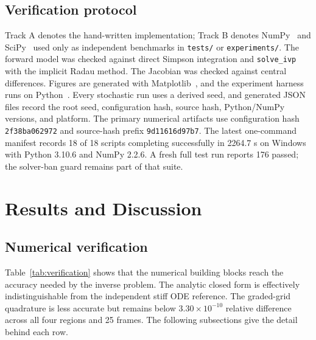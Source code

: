 \documentclass[sigconf,nonacm]{acmart}
\begin{document}
\subsection{Verification protocol}

Track A denotes the hand-written implementation; Track B denotes NumPy~\cite{harris2020} and SciPy~\cite{virtanen2020} used only as independent benchmarks in \texttt{tests/} or \texttt{experiments/}. The forward model was checked against direct Simpson integration and \texttt{solve\_ivp} with the implicit Radau method. The Jacobian was checked against central differences. Figures are generated with Matplotlib~\cite{hunter2007}, and the experiment harness runs on Python~\cite{python2026}. Every stochastic run uses a derived seed, and generated JSON files record the root seed, configuration hash, source hash, Python/NumPy versions, and platform. The primary numerical artifacts use configuration hash \texttt{2f38ba062972} and source-hash prefix \texttt{9d11616d97b7}. The latest one-command manifest records 18 of 18 scripts completing successfully in 2264.7 s on Windows with Python 3.10.6 and NumPy 2.2.6. A fresh full test run reports 176 passed; the solver-ban guard remains part of that suite.

\section{Results and Discussion}

\subsection{Numerical verification}

Table~\ref{tab:verification} shows that the numerical building blocks reach the accuracy needed by the inverse problem. The analytic closed form is effectively indistinguishable from the independent stiff ODE reference. The graded-grid quadrature is less accurate but remains below $3.30\times10^{-10}$ relative difference across all four regions and 25 frames. The following subsections give the detail behind each row.
\end{document}
